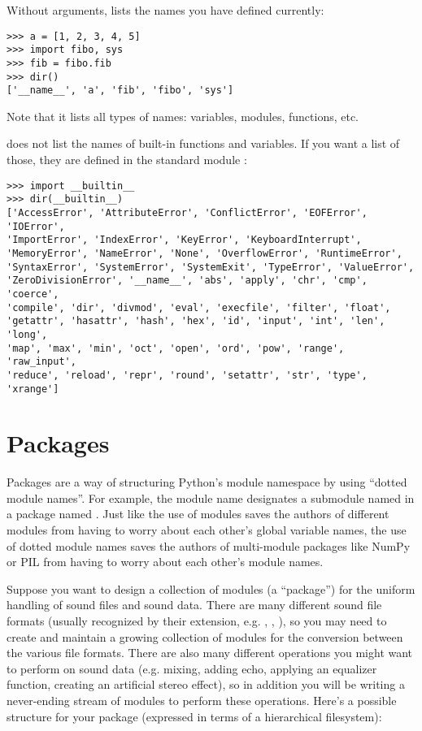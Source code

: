 \documentclass{manual}
\begin{document}
Without arguments,  lists the names you have defined
currently:

\begin{verbatim}
>>> a = [1, 2, 3, 4, 5]
>>> import fibo, sys
>>> fib = fibo.fib
>>> dir()
['__name__', 'a', 'fib', 'fibo', 'sys']
\end{verbatim}

Note that it lists all types of names: variables, modules, functions, etc.

 does not list the names of built-in functions and
variables.  If you want a list of those, they are defined in the
standard module :

\begin{verbatim}
>>> import __builtin__
>>> dir(__builtin__)
['AccessError', 'AttributeError', 'ConflictError', 'EOFError', 'IOError',
'ImportError', 'IndexError', 'KeyError', 'KeyboardInterrupt',
'MemoryError', 'NameError', 'None', 'OverflowError', 'RuntimeError',
'SyntaxError', 'SystemError', 'SystemExit', 'TypeError', 'ValueError',
'ZeroDivisionError', '__name__', 'abs', 'apply', 'chr', 'cmp', 'coerce',
'compile', 'dir', 'divmod', 'eval', 'execfile', 'filter', 'float',
'getattr', 'hasattr', 'hash', 'hex', 'id', 'input', 'int', 'len', 'long',
'map', 'max', 'min', 'oct', 'open', 'ord', 'pow', 'range', 'raw_input',
'reduce', 'reload', 'repr', 'round', 'setattr', 'str', 'type', 'xrange']
\end{verbatim}

\section{Packages \label{packages}}

Packages are a way of structuring Python's module namespace
by using ``dotted module names''.  For example, the module name
 designates a submodule named  in a package named
.  Just like the use of modules saves the authors of different
modules from having to worry about each other's global variable names,
the use of dotted module names saves the authors of multi-module
packages like NumPy or PIL from having to worry about each other's
module names.

Suppose you want to design a collection of modules (a ``package'') for
the uniform handling of sound files and sound data.  There are many
different sound file formats (usually recognized by their extension,
e.g. , , ), so you may need to create
and maintain a growing collection of modules for the conversion
between the various file formats.  There are also many different
operations you might want to perform on sound data (e.g. mixing,
adding echo, applying an equalizer function, creating an artificial
stereo effect), so in addition you will be writing a never-ending
stream of modules to perform these operations.  Here's a possible
structure for your package (expressed in terms of a hierarchical
filesystem):
\end{document}
